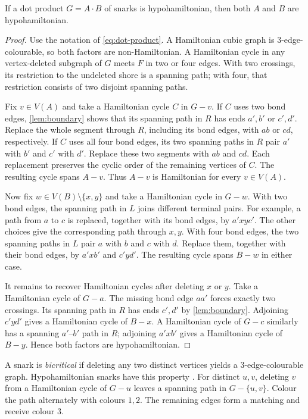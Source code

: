 \documentclass[justified,notoc,twoside,nobib,nofonts]{tufte-handout}
\begin{document}
\begin{lemma}\label{lem:descent}
If a dot product $G=A\mathbin{\cdot}B$ of snarks is hypohamiltonian,
then both $A$ and $B$ are hypohamiltonian.
\end{lemma}
\begin{proof}
Use the notation of \eqref{eq:dot-product}. A Hamiltonian cubic graph
is $3$-edge-colourable, so both factors are non-Hamiltonian.
A Hamiltonian cycle in any vertex-deleted subgraph of $G$ meets $F$
in two or four edges. With two crossings, its restriction to the
undeleted shore is a spanning path; with four, that restriction
consists of two disjoint spanning paths.

Fix $v\in V(A)$ and take a Hamiltonian cycle $C$ in $G-v$.
If $C$ uses two bond edges, \cref{lem:boundary} shows that its spanning
path in $R$ has ends $a',b'$ or $c',d'$. Replace the whole segment
through $R$, including its bond edges, with $ab$ or $cd$, respectively.
If $C$ uses all four bond edges, its two spanning paths in $R$ pair
$a'$ with $b'$ and $c'$ with $d'$. Replace these two segments with
$ab$ and $cd$. Each replacement preserves the cyclic order of the
remaining vertices of $C$. The resulting cycle spans $A-v$.
Thus $A-v$ is Hamiltonian for every $v\in V(A)$.

Now fix $w\in V(B)\setminus\{x,y\}$ and take a Hamiltonian cycle in
$G-w$. With two bond edges, the spanning path in $L$ joins different
terminal pairs. For example, a path from $a$ to $c$ is replaced,
together with its bond edges, by $a'xyc'$. The other choices give the
corresponding path through $x,y$.
With four bond edges, the two spanning paths in $L$ pair $a$ with $b$
and $c$ with $d$. Replace them, together with their bond edges, by
$a'xb'$ and $c'yd'$. The resulting cycle spans $B-w$ in either case.

It remains to recover Hamiltonian cycles after deleting $x$ or $y$.
Take a Hamiltonian cycle of $G-a$. The missing bond edge $aa'$ forces
exactly two crossings. Its spanning path in $R$ has ends $c',d'$ by
\cref{lem:boundary}. Adjoining $c'yd'$ gives a Hamiltonian cycle of
$B-x$. A Hamiltonian cycle of $G-c$ similarly has a spanning
$a'$--$b'$ path in $R$; adjoining $a'xb'$ gives a Hamiltonian cycle
of $B-y$. Hence both factors are hypohamiltonian.
\end{proof}

A snark is \emph{bicritical} if deleting any two distinct vertices
yields a $3$-edge-colourable graph. Hypohamiltonian snarks have this
property \citep[Section~1]{GZ18}. For distinct $u,v$, deleting $v$
from a Hamiltonian cycle of $G-u$ leaves a spanning path in
$G-\{u,v\}$. Colour the path alternately with colours $1,2$.
The remaining edges form a matching and receive colour $3$.
\end{document}
